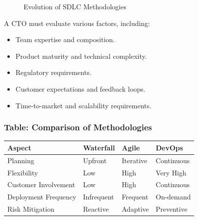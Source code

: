 \begin{figure}[h]
    \centering
    \caption{Evolution of SDLC Methodologies}
    \label{fig:sdlc_comparison}
\end{figure}

A CTO must evaluate various factors, including:
\begin{itemize}
    \item Team expertise and composition.
    \item Product maturity and technical complexity.
    \item Regulatory requirements.
    \item Customer expectations and feedback loops.
    \item Time-to-market and scalability requirements.
\end{itemize}

\subsubsection*{Table: Comparison of Methodologies}
\begin{tabular}{|l|l|l|l|}
    \hline
    \textbf{Aspect}      & \textbf{Waterfall} & \textbf{Agile} & \textbf{DevOps} \\
    \hline
    Planning             & Upfront            & Iterative      & Continuous      \\
    \hline
    Flexibility          & Low                & High           & Very High       \\
    \hline
    Customer Involvement & Low                & High           & Continuous      \\
    \hline
    Deployment Frequency & Infrequent         & Frequent       & On-demand       \\
    \hline
    Risk Mitigation      & Reactive           & Adaptive       & Preventive      \\
    \hline
\end{tabular}

